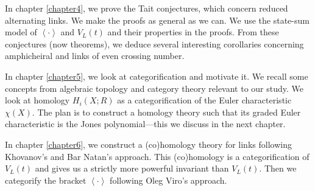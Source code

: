 In chapter \ref{chapter4}, we prove the Tait conjectures, which concern reduced alternating links. We make the proofs as general as we can. We use the state-sum model of $\left< \cdot \right>$ and $V_L(t)$ and their properties in the proofs. From these conjectures (now theorems), we deduce several interesting corollaries concerning amphicheiral and links of even crossing number.

In chapter \ref{chapter5}, we look at categorification and motivate it. We recall some concepts from algebraic topology and category theory relevant to our study. We look at homology $H_i(X; R)$ as a categorification of the Euler characteristic $\chi(X)$. The plan is to construct a homology theory such that its graded Euler characteristic is the Jones polynomial---this we discuss in the next chapter.%

In chapter \ref{chapter6}, we construct a (co)homology theory for links following Khovanov's \cite{10.1215/S0012-7094-00-10131-7} and Bar Natan's \cite{10.2140/agt.2002.2.337} approach. This (co)homology is a categorification of $V_L(t)$ and gives us a strictly more powerful invariant than $V_L(t)$. Then we categorify the bracket $\left< \cdot \right>$ following Oleg Viro's \cite{OlegViro2004} approach. %
